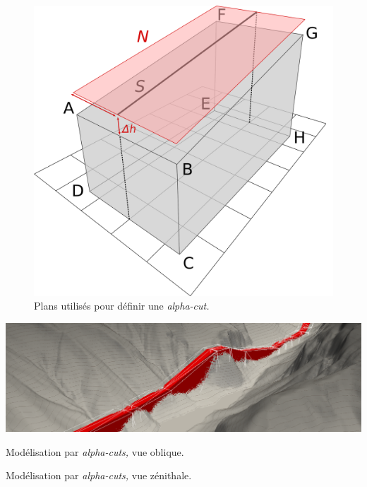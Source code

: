 \begin{figure}
  \centering
  \includegraphics[height=0.3\textheight]{../figures/polyhedre.png}
  \caption{Plans utilisés pour définir une \emph{alpha-cut.}}
  \label{fig:schema_polyhedre}
\end{figure}

\begin{carte}
  \centering
  \includegraphics[width=\textwidth]{../figures/AlphaCut_coupe.png}
  \caption{Modélisation par \emph{alpha-cuts,} vue oblique.}
  \label{fig:AlphaCuts_coupe}
\end{carte}

\begin{carte}
  \centering
  
  \caption{Modélisation par \emph{alpha-cuts,} vue zénithale.}
  \label{fig:AlphaCuts_zenith}
\end{carte}

